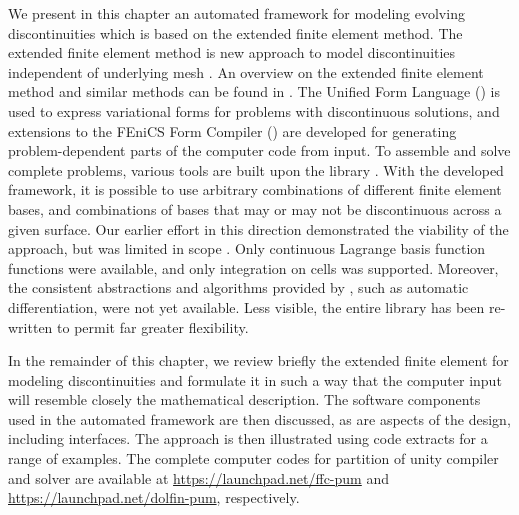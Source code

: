 We present in this chapter an automated framework for modeling
evolving discontinuities which is based on the extended finite
element method. The extended finite element method is new
approach to model discontinuities independent of underlying mesh
\citep{BelytschkoBlack1999,MoesDolbowBelytschko1999,WellsSluys2001}.
An overview on the extended finite element method and similar methods
can be found in \citet{BabuskaBanerjeeOsborn2003}. The Unified Form
Language (\ufl) is used to express variational forms for problems with
discontinuous solutions, and extensions to the FEniCS Form Compiler
(\ffc) are developed for generating problem-dependent parts of the
computer code from \ufl{} input. To assemble and solve complete problems,
various tools are built upon the library \dolfin.  With the developed
framework, it is possible to use arbitrary combinations of different
finite element bases, and combinations of bases that may or may not
be discontinuous across a given surface. Our earlier effort in this
direction demonstrated the viability of the approach, but was limited in
scope \citep{NikbakhtWells2009}. Only continuous Lagrange basis function
functions were available, and only integration on cells was supported.
Moreover, the consistent abstractions and algorithms provided by {\ufl},
such as automatic differentiation, were not yet available. Less visible,
the entire library has been re-written to permit far greater flexibility.

In the remainder of this chapter, we review briefly the extended finite
element for modeling discontinuities and formulate it in such a way that
the computer input will resemble closely the mathematical description. The
software components used in the automated framework are then discussed,
as are aspects of the design, including interfaces. The approach is then
illustrated using code extracts for a range of examples.
The complete computer codes for partition of unity compiler and solver are available
at \url{https://launchpad.net/ffc-pum} and \url{https://launchpad.net/dolfin-pum}, respectively.
